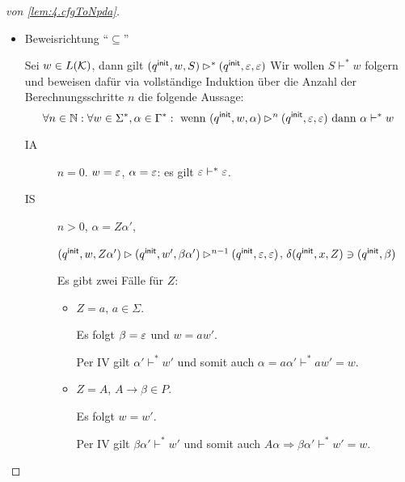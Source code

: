 \begin{proof}[von \autoref{lem:4.cfgToNpda}]
\begin{itemize}
        Per Konstruktion gilt $(\qinit, BC) \in \delta(\qinit, \Eps, A)$. 

        Ferner gilt per IV, dass $(\qinit, Y(\mathcal{A}_1), B) \ConfRel^* (\qinit, \Eps, \Eps)$ und $(\qinit, Y(\mathcal{A}_2), C) \ConfRel^* (\qinit, \Eps, \Eps)$.

        Es folgt mit \autoref{lem:4.mehrKeller}, dass $(\qinit, w, A) = (\qinit, Y(\mathcal{A}_1)Y(\mathcal{A}_2), A)\ConfRel (\qinit, Y(\mathcal{A}_1)Y(\mathcal{A}_2), BC) \ConfRel^* (\qinit, Y(\mathcal{A}_2), C) \ConfRel^* (\qinit, \Eps, \Eps)$.
 \item Beweisrichtung  ``$\subseteq$''
 
 Sei $w\in L(\mathcal{K})$, dann gilt $(q^\mathsf{init}, w, S) \rhd^* (q^\mathsf{init}, \varepsilon, \varepsilon)$
 Wir wollen $S \vdash^* w$ folgern und beweisen dafür via vollständige Induktion über die Anzahl der Berechnungsschritte $n$ die folgende Aussage:
     \begin{displaymath}
      \forall n \in \mathbb{N}: \forall w \in \Sigma^*, \alpha \in \Gamma^*: \text{ wenn } (q^\mathsf{init}, w, \alpha) \rhd^n (q^\mathsf{init}, \varepsilon, \varepsilon) \text{ dann } \alpha \vdash^* w 
    \end{displaymath}
    
    \begin{description}
    \item[IA] $n = 0$.
      $w = \varepsilon$, $\alpha = \varepsilon$: es gilt $\varepsilon \vdash^* \varepsilon$.

  \item[IS] $n > 0$, $\alpha = Z\alpha'$,

    $(q^\mathsf{init},w,Z\alpha') \rhd (q^\mathsf{init}, w', \beta\alpha') \rhd^{n-1} (q^\mathsf{init}, \varepsilon, \varepsilon)$, $\delta(q^\mathsf{init}, x, Z) \ni (q^\mathsf{init}, \beta)$

    Es gibt zwei Fälle für $Z$:
    \begin{itemize}
    \item $Z = a$, $a \in \Sigma$.

      Es folgt $\beta = \varepsilon$ und $w = aw'$.

      Per IV gilt $\alpha' \vdash^* w'$ und somit auch $\alpha = a\alpha' \vdash^*aw' = w$.
    \item $Z = A$, $A \to \beta \in P$.

      Es folgt $w = w'$.

      Per IV gilt $\beta\alpha' \vdash^* w'$ und somit auch $A\alpha \Longrightarrow \beta\alpha' \vdash^* w' = w$.
    \end{itemize}
    \end{description}
 
\end{itemize}

\end{proof}

